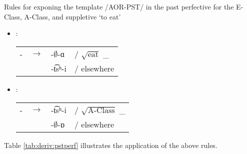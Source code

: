 \begin{newruleblock}
	{Rules for exponing the template /AOR-PST/ in the past perfective for the E-Class, A-Class, and suppletive `to eat'} %
	
	\begin{itemize}
	\item \seaSE: \begin{tabular}[t]{@{}llll@{}} 
				  {\aor}-{\pst} &$\rightarrow$ & -$\emptyset$-ɑ & / $\sqrt{\text{eat}}$ {\thgloss} \_ \\
				                 &             & -t͡sʰ-i &/ elsewhere\\
	               \end{tabular}
   \item \iaIA: \begin{tabular}[t]{@{}llll@{}}
			    {\aor}-{\pst} &$\rightarrow$ & -t͡sʰ-i & / $\sqrt{\text{A-Class}}$ {\thgloss} \_     \\
			                  &              & -$\emptyset$-ɒ &/ elsewhere \\
                \end{tabular}               
     \end{itemize}
\end{newruleblock}


Table \ref{tab:deriv:pstperf}  illustrates the application of the above rules. 

\begin{table}
	\caption{Deriving or exponing the template {\aor}-{\pst} in the past perfective}
	\label{tab:deriv:pstperf}
\end{table}

